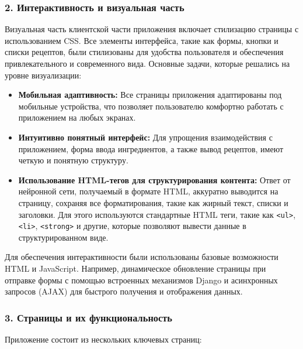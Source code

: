 {{    \subsubsection*{2. Интерактивность и визуальная часть}
    
    Визуальная часть клиентской части приложения включает стилизацию страницы с использованием CSS. Все элементы интерфейса, такие как формы, кнопки и списки рецептов, были стилизованы для удобства пользователя и обеспечения привлекательного и современного вида. Основные задачи, которые решались на уровне визуализации:
    
    \begin{itemize}
        \item \textbf{Мобильная адаптивность:} Все страницы приложения адаптированы под мобильные устройства, что позволяет пользователю комфортно работать с приложением на любых экранах.
        \item \textbf{Интуитивно понятный интерфейс:} Для упрощения взаимодействия с приложением, форма ввода ингредиентов, а также вывод рецептов, имеют четкую и понятную структуру.
        \item \textbf{Использование HTML-тегов для структурирования контента:} Ответ от нейронной сети, получаемый в формате HTML, аккуратно выводится на страницу, сохраняя все форматирования, такие как жирный текст, списки и заголовки. Для этого используются стандартные HTML теги, такие как \texttt{<ul>}, \texttt{<li>}, \texttt{<strong>} и другие, которые позволяют вывести данные в структурированном виде.
    \end{itemize}
    
    Для обеспечения интерактивности были использованы базовые возможности HTML и JavaScript. Например, динамическое обновление страницы при отправке формы с помощью встроенных механизмов Django и асинхронных запросов (AJAX) для быстрого получения и отображения данных.
    
    \subsubsection*{3. Страницы и их функциональность}
    
    Приложение состоит из нескольких ключевых страниц:
    
}}
